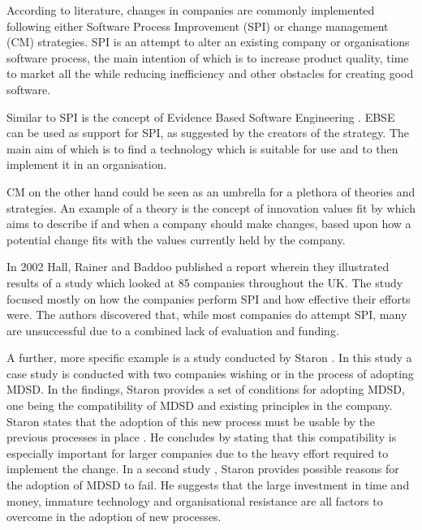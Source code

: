 \documentclass[10pt,twocolumn]{article}
\begin{document}
According to literature, changes in companies are commonly implemented following either Software Process Improvement (SPI)\cite{pettersson2008practitioner}\cite{unterkalmsteiner2012evaluation} or change management (CM) strategies. SPI is an attempt to alter an existing company or organisations software process, the main intention of which is to increase product quality, time to market all the while reducing inefficiency and other obstacles for creating good software. 

Similar to SPI is the concept of Evidence Based Software Engineering \cite{dyba2005evidence}. EBSE can be used as support for SPI, as suggested by the creators of the strategy. The main aim of which is to find a technology which is suitable for use and to then implement it in an organisation.

CM on the other hand could be seen as an umbrella for a plethora of theories and strategies. An example of a theory is the concept of innovation values fit by \cite{klein1996challenge} which aims to describe if and when a company should make changes, based upon how a potential change fits with the values currently held by the company.

In 2002 Hall, Rainer and Baddoo \cite{hall2002implementing} published a report wherein they illustrated results of a study which looked at 85 companies throughout the UK. The study focused mostly on how the companies perform SPI and how effective their efforts were. The authors discovered that, while most companies do attempt SPI, many are unsuccessful due to a combined lack of evaluation and funding. 

A further, more specific example is a study conducted by Staron \cite{staron2006adopting}. In this study a case study is conducted with two companies wishing or in the process of adopting MDSD. In the findings, Staron provides a set of conditions for adopting MDSD, one being the compatibility of MDSD and existing principles in the company. Staron states that the adoption of this new process must be usable by the previous processes in place \cite{staron2006adopting}. He concludes by stating that this compatibility is especially important for larger companies due to the heavy effort required to implement the change. In a second study \cite{staron2008transitioning}, Staron provides possible reasons for the adoption of MDSD to fail. He suggests that the large investment in time and money, immature technology and organisational resistance are all factors to overcome in the adoption of new processes.
\end{document}

